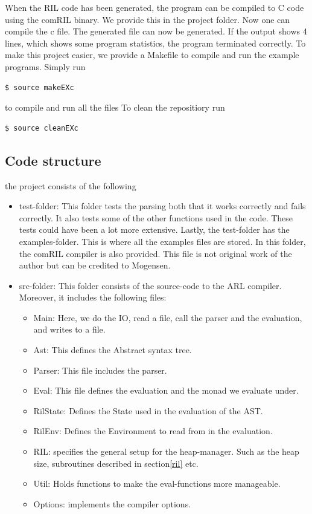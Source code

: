 \documentclass[a4paper]{article}
\begin{document}
When the RIL code has been generated, the program can be compiled to C code using the comRIL binary. We provide this in the project folder. Now one can compile the c file. The generated file can now be generated. If the output shows 4 lines, which shows some program statistics, the program terminated correctly. To make this project easier, we provide a Makefile to compile and run the example programs. Simply run
\begin{verbatim}
$ source makeEXc
\end{verbatim}
to compile and run all the files
To clean the repositiory run
\begin{verbatim}
$ source cleanEXc
\end{verbatim}
\subsection{Code structure}
\label{sec:org411c5cd}
the project consists of the following
\begin{itemize}
\item test-folder: This folder tests the parsing both that it works correctly and fails correctly. It also tests some of the other functions used in the code. These tests could have been a lot more extensive. Lastly, the test-folder has the examples-folder. This is where all the examples files are stored. In this folder, the comRIL compiler is also provided. This file is not original work of the author but can be credited to Mogensen.
\item src-folder: This folder consists of the source-code to the ARL compiler. Moreover, it includes the following files:
\begin{itemize}
\item Main: Here, we do the IO, read a file, call the parser and the evaluation, and writes to a file.
\item Ast: This defines the Abstract syntax tree.
\item Parser: This file includes the parser.
\item Eval: This file defines the evaluation and the monad we evaluate under.
\item RilState: Defines the State used in the evaluation of the AST.
\item RilEnv:  Defines the Environment to read from in the evaluation.
\item RIL: specifies the general setup for the heap-manager. Such as the heap size, subroutines described in section\ref{ril} etc.
\item Util: Holds functions to make the eval-functions more manageable.
\item Options: implements the compiler options.
\end{itemize}
\end{itemize}
\end{document}
